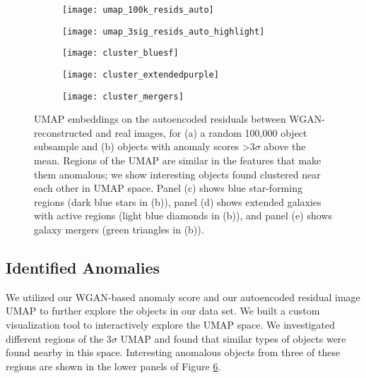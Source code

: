 \documentclass{article}
\begin{document}
\begin{figure}[t!]
\begin{subfigure}{.495\textwidth}
  \centering
  \texttt{[image: umap\_100k\_resids\_auto]}  
  \caption{}
  \label{fig:umap100k}
\end{subfigure}
\hfill
\vspace{0cm}
\begin{subfigure}{.495\textwidth}
  \centering
  \texttt{[image: umap\_3sig\_resids\_auto\_highlight]}  
  \caption{}
  \label{fig:umap3sig}
\end{subfigure}
\begin{subfigure}{.32\textwidth}
  \centering
  \texttt{[image: cluster\_bluesf]}  
  \caption{}
  \label{fig:bluesf}
\end{subfigure}
\hfill
\begin{subfigure}{.32\textwidth}
  \centering
  \texttt{[image: cluster\_extendedpurple]}  
  \caption{}
  \label{fig:extendedpurple}
\end{subfigure}
\hfill
\begin{subfigure}{.32\textwidth}
  \centering
  \texttt{[image: cluster\_mergers]}  
  \caption{}
  \label{fig:mergers}
\end{subfigure}
\vspace{0cm}
\caption{UMAP embeddings on the autoencoded residuals between WGAN-reconstructed and real images, for (a) a random 100,000 object subsample and (b) objects with anomaly scores >3$\sigma$ above the mean. Regions of the UMAP are similar in the features that make them anomalous; we show interesting objects found clustered near each other in UMAP space. Panel (c) shows blue star-forming regions (dark blue stars in (b)), panel (d) shows extended galaxies with active regions (light blue diamonds in (b)), and panel  (e) shows galaxy mergers (green triangles in (b)).}
\label{fig:umap}
\end{figure}

\subsection{Identified Anomalies}

We utilized our WGAN-based anomaly score and our autoencoded residual image UMAP to further explore the objects in our data set.
We built a custom visualization tool to interactively explore the UMAP space.
We investigated different regions of the 3$\sigma$ UMAP and found that similar types of objects were found nearby in this space.
Interesting anomalous objects from three of these regions are shown in the lower panels of Figure \ref{fig:umap}.
\end{document}
